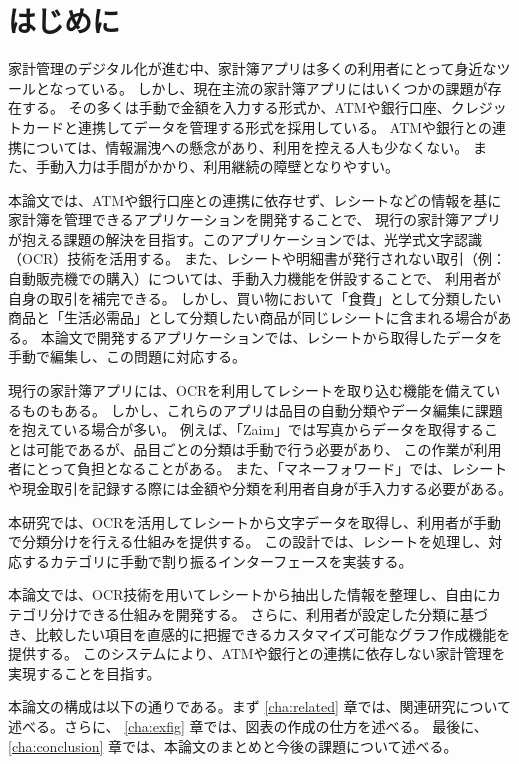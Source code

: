 \documentclass[main]{subfiles}
\begin{document}
\chapter{はじめに}
\label{cha:intro}

家計管理のデジタル化が進む中、家計簿アプリは多くの利用者にとって身近なツールとなっている。
しかし、現在主流の家計簿アプリにはいくつかの課題が存在する。
その多くは手動で金額を入力する形式か、ATMや銀行口座、クレジットカードと連携してデータを管理する形式を採用している。
ATMや銀行との連携については、情報漏洩への懸念があり、利用を控える人も少なくない。
また、手動入力は手間がかかり、利用継続の障壁となりやすい。

本論文では、ATMや銀行口座との連携に依存せず、レシートなどの情報を基に家計簿を管理できるアプリケーションを開発することで、
現行の家計簿アプリが抱える課題の解決を目指す。このアプリケーションでは、光学式文字認識（OCR）技術を活用する。
また、レシートや明細書が発行されない取引（例：自動販売機での購入）については、手動入力機能を併設することで、
利用者が自身の取引を補完できる。
しかし、買い物において「食費」として分類したい商品と「生活必需品」として分類したい商品が同じレシートに含まれる場合がある。
本論文で開発するアプリケーションでは、レシートから取得したデータを手動で編集し、この問題に対応する。

現行の家計簿アプリには、OCRを利用してレシートを取り込む機能を備えているものもある。
しかし、これらのアプリは品目の自動分類やデータ編集に課題を抱えている場合が多い。
例えば、「Zaim」では写真からデータを取得することは可能であるが、品目ごとの分類は手動で行う必要があり、
この作業が利用者にとって負担となることがある。
また、「マネーフォワード」では、レシートや現金取引を記録する際には金額や分類を利用者自身が手入力する必要がある。

本研究では、OCRを活用してレシートから文字データを取得し、利用者が手動で分類分けを行える仕組みを提供する。
この設計では、レシートを処理し、対応するカテゴリに手動で割り振るインターフェースを実装する。

本論文では、OCR技術を用いてレシートから抽出した情報を整理し、自由にカテゴリ分けできる仕組みを開発する。
さらに、利用者が設定した分類に基づき、比較したい項目を直感的に把握できるカスタマイズ可能なグラフ作成機能を提供する。
このシステムにより、ATMや銀行との連携に依存しない家計管理を実現することを目指す。

本論文の構成は以下の通りである。まず \ref{cha:related} 章では、関連研究について述べる。さらに、
\ref{cha:exfig} 章では、図表の作成の仕方を述べる。
最後に、\ref{cha:conclusion} 章では、本論文のまとめと今後の課題について述べる。
\end{document}
